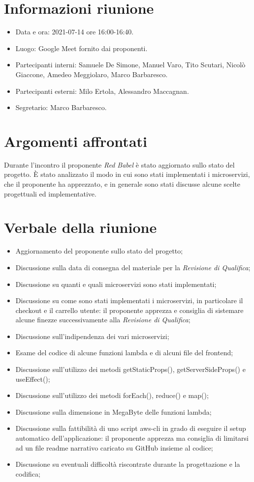 \documentclass[a4paper]{article}
\begin{document}
\newpage
\tableofcontents
\newpage

\section{Informazioni riunione}
\begin{itemize}
    \item Data e ora: 2021-07-14 ore 16:00-16:40.
    \item Luogo: Google Meet fornito dai proponenti.
    \item Partecipanti interni: Samuele De Simone, Manuel Varo, Tito Scutari, Nicolò Giaccone, Amedeo Meggiolaro, Marco Barbaresco.
    \item Partecipanti esterni: Milo Ertola, Alessandro Maccagnan.
    \item Segretario: Marco Barbaresco.
\end{itemize}
\section{Argomenti affrontati}
Durante l'incontro il proponente \textit{Red Babel} è stato aggiornato sullo stato del progetto. È stato analizzato il modo in cui sono stati
implementati i microservizi, che il proponente ha apprezzato, e in generale sono stati discusse alcune scelte progettuali ed implementative.
\section{Verbale della riunione}
\begin{itemize}
    \item Aggiornamento del proponente sullo stato del progetto;
    \item Discussione sulla data di consegna del materiale per la \textit{Revisione di Qualifica};
    \item Discussione su quanti e quali microservizi sono stati implementati;
    \item Discussione su come sono stati implementati i microservizi, in particolare il checkout e il carrello utente: il proponente apprezza e consiglia di sistemare
          alcune finezze successivamente alla \textit{Revisione di Qualifica};
    \item Discussione sull'indipendenza dei vari microservizi;
    \item Esame del codice di alcune funzioni lambda e di alcuni file del frontend;
    \item Discussione sull'utilizzo dei metodi getStaticProps(), getServerSideProps() e useEffect();
    \item Discussione sull'utilizzo dei metodi forEach(), reduce() e map();
    \item Discussione sulla dimensione in MegaByte delle funzioni lambda;
    \item Discussione sulla fattibilità di uno script aws-cli in grado di eseguire il setup automatico dell'applicazione: il proponente apprezza ma consiglia di limitarsi ad un
          file readme narrativo caricato su GitHub insieme al codice;
    \item Discussione su eventuali difficoltà riscontrate durante la progettazione e la codifica;
\end{itemize}
\newpage
\end{document}
